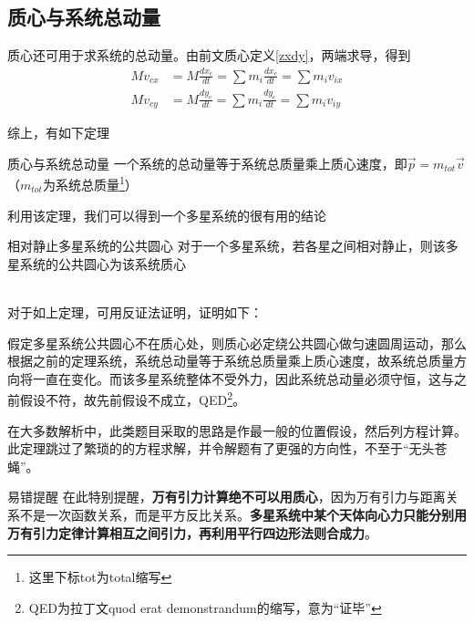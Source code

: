 \subsection{质心与系统总动量}
质心还可用于求系统的总动量。由前文质心定义\eqref{zxdy}，两端求导，得到
\begin{subequations}
\begin{align*}
M v_{cx} &= M \frac{d x_c}{dt} = \sum m_i \frac{d x_c}{dt} = \sum m_i v_{ix} \\
M v_{cy} &= M \frac{d y_c}{dt} = \sum m_i \frac{d y_c}{dt} = \sum m_i v_{iy}  
\end{align*}
\end{subequations}

综上，有如下定理

\begin{theo}[label=zxyxtzdl]{质心与系统总动量}{}
一个系统的总动量等于系统总质量乘上质心速度，即$\vec{p} = m_{tot} \vec{v}$（$m_{tot}$为系统总质量\footnote{这里下标tot为total缩写}）
\end{theo}

利用该定理，我们可以得到一个多星系统的很有用的结论
~\\

\begin{minipage}[b]{0.3\linewidth}

\end{minipage}
\hfill
\begin{minipage}[b]{0.5\linewidth}
\begin{theo}{相对静止多星系统的公共圆心}{}
对于一个多星系统，若各星之间相对静止，则该多星系统的公共圆心为该系统质心
\end{theo}
\end{minipage}
~\\

对于如上定理，可用反证法证明，证明如下：

假定多星系统公共圆心不在质心处，则质心必定绕公共圆心做匀速圆周运动，那么根据之前的定理系统，系统总动量等于系统总质量乘上质心速度，故系统总质量方向将一直在变化。而该多星系统整体不受外力，因此系统总动量必须守恒，这与之前假设不符，故先前假设不成立，QED\footnote{QED为拉丁文quod erat demonstrandum的缩写，意为“证毕”}。

在大多数解析中，此类题目采取的思路是作最一般的位置假设，然后列方程计算。此定理跳过了繁琐的的方程求解，并令解题有了更强的方向性，不至于“无头苍蝇”。

\begin{mk}{易错提醒}{}
在此特别提醒，\textbf{万有引力计算绝不可以用质心}，因为万有引力与距离关系不是一次函数关系，而是平方反比关系。\textbf{多星系统中某个天体向心力只能分别用万有引力定律计算相互之间引力，再利用平行四边形法则合成力}。
\end{mk}

